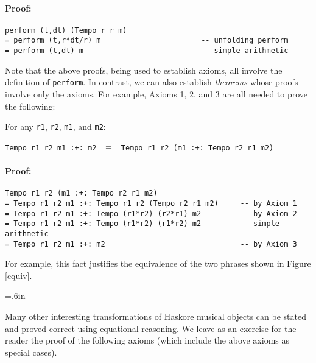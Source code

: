 \paragraph*{Proof:}
\begin{verbatim} 
perform (t,dt) (Tempo r r m)
= perform (t,r*dt/r) m                       -- unfolding perform
= perform (t,dt) m                           -- simple arithmetic
\end{verbatim} 

Note that the above proofs, being used to establish axioms, all
involve the definition of {\tt perform}.  In contrast, we can also
establish {\em theorems} whose proofs involve only the axioms.  For
example, Axioms 1, 2, and 3 are all needed to prove the following:
\begin{theorem}
For any {\tt r1}, {\tt r2}, {\tt m1}, and {\tt m2}:
\begin{center}
{\tt Tempo r1 r2 m1 :+:\ m2} $\ \ \equiv\ \ $ {\tt Tempo r1 r2 (m1 :+:\ Tempo r2 r1 m2)}
\end{center}
\end{theorem}
\paragraph*{Proof:}
\begin{verbatim} 
Tempo r1 r2 (m1 :+: Tempo r2 r1 m2)
= Tempo r1 r2 m1 :+: Tempo r1 r2 (Tempo r2 r1 m2)     -- by Axiom 1
= Tempo r1 r2 m1 :+: Tempo (r1*r2) (r2*r1) m2         -- by Axiom 2
= Tempo r1 r2 m1 :+: Tempo (r1*r2) (r1*r2) m2         -- simple arithmetic
= Tempo r1 r2 m1 :+: m2                               -- by Axiom 3
\end{verbatim} 
For example, this fact justifies the equivalence of the two phrases
shown in Figure \ref{equiv}.

\begin{figure*}
\centerline{
\epsfysize=.6in 
}
\caption{Equivalent Phrases}
\label{equiv}
\end{figure*}

Many other interesting transformations of Haskore musical objects can
be stated and proved correct using equational reasoning.  We leave as
an exercise for the reader the proof of the following axioms (which
include the above axioms as special cases).

